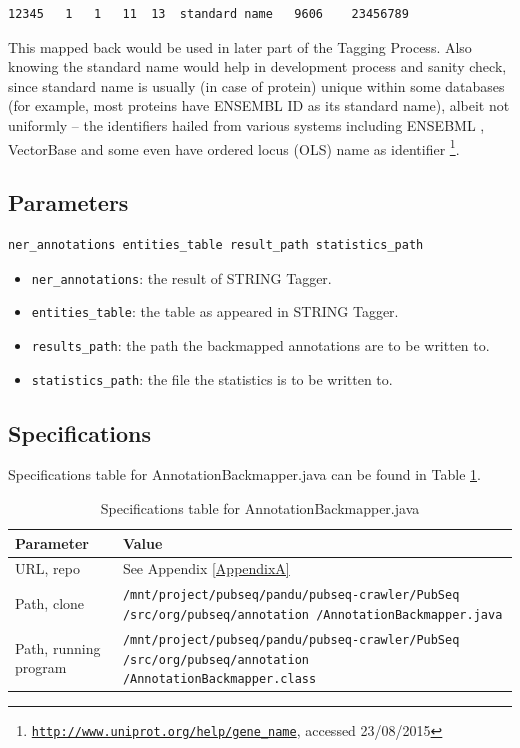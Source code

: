 \begin{lstlisting}[breaklines]
12345	1	1	11	13	standard name	9606	23456789
\end{lstlisting}

This mapped back would be used in later part of the Tagging Process. Also knowing the standard name would help in development process and sanity check, since standard name is usually (in case of protein) unique within some databases (for example, most proteins have ENSEMBL ID as its standard name), albeit not uniformly -- the identifiers hailed from various systems including ENSEBML \citep{hubbard2002ensembl}, VectorBase \citep{lawson2009vectorbase} and some even have ordered locus (OLS) name as identifier \footnote{\href{http://www.uniprot.org/help/gene_name}{\texttt{http://www.uniprot.org/help/gene\_name}}, accessed 23/08/2015}.

\subsection{Parameters}

\begin{lstlisting}[breaklines]
ner_annotations entities_table result_path statistics_path
\end{lstlisting}

\begin{itemize}
\item \texttt{ner\_annotations}: the result of STRING Tagger.
\item \texttt{entities\_table}: the table as appeared in STRING Tagger.
\item \texttt{results\_path}: the path the backmapped annotations are to be written to.
\item \texttt{statistics\_path}: the file the statistics is to be written to.
\end{itemize}

\subsection{Specifications}

Specifications table for AnnotationBackmapper.java can be found in Table \ref{tab:AnnotationBackmapper}.

\begin{table}[htbp]
\caption{Specifications table for AnnotationBackmapper.java}
\centering
\begin{tabularx}{\textwidth}{ | l | X | }
  \hline
  Parameter & Value \\
  \hline
  URL, repo & See Appendix \ref{AppendixA} \\
  Path, clone & \texttt{/mnt/project/pubseq/pandu/pubseq-crawler/PubSeq /src/org/pubseq/annotation /AnnotationBackmapper.java} \\
  Path, running program & \texttt{/mnt/project/pubseq/pandu/pubseq-crawler/PubSeq /src/org/pubseq/annotation /AnnotationBackmapper.class}\\
  \hline
\end{tabularx}
\label{tab:AnnotationBackmapper}
\end{table}

